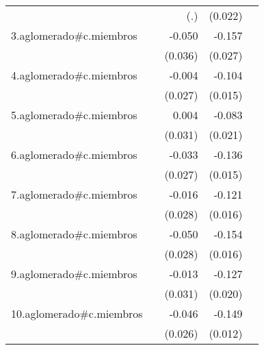 {\begin{longtable}{l*{4}{D{.}{.}{-1}}}
            &                     &         (.)         &     (0.022)         &                     \\
\addlinespace
3.aglomerado#c.miembros&                     &      -0.050         &      -0.157\sym{***}&                     \\
            &                     &     (0.036)         &     (0.027)         &                     \\
\addlinespace
4.aglomerado#c.miembros&                     &      -0.004         &      -0.104\sym{***}&                     \\
            &                     &     (0.027)         &     (0.015)         &                     \\
\addlinespace
5.aglomerado#c.miembros&                     &       0.004         &      -0.083\sym{***}&                     \\
            &                     &     (0.031)         &     (0.021)         &                     \\
\addlinespace
6.aglomerado#c.miembros&                     &      -0.033         &      -0.136\sym{***}&                     \\
            &                     &     (0.027)         &     (0.015)         &                     \\
\addlinespace
7.aglomerado#c.miembros&                     &      -0.016         &      -0.121\sym{***}&                     \\
            &                     &     (0.028)         &     (0.016)         &                     \\
\addlinespace
8.aglomerado#c.miembros&                     &      -0.050         &      -0.154\sym{***}&                     \\
            &                     &     (0.028)         &     (0.016)         &                     \\
\addlinespace
9.aglomerado#c.miembros&                     &      -0.013         &      -0.127\sym{***}&                     \\
            &                     &     (0.031)         &     (0.020)         &                     \\
\addlinespace
10.aglomerado#c.miembros&                     &      -0.046         &      -0.149\sym{***}&                     \\
            &                     &     (0.026)         &     (0.012)         &                     \\

\end{longtable}}
